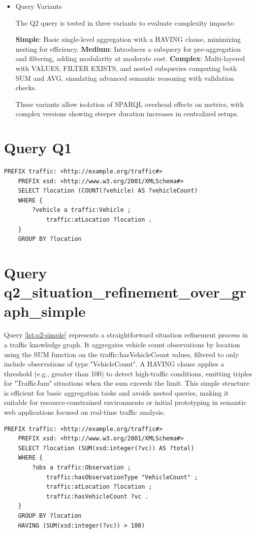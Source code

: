 \documentclass[5p,times]{elsarticle}
\begin{document}
\begin{itemize}
    \item Query Variants
    
    The Q2 query is tested in three variants to evaluate complexity impacts:

    \textbf{Simple}: Basic single-level aggregation with a HAVING clause, minimizing nesting for efficiency.
    \textbf{Medium}: Introduces a subquery for pre-aggregation and filtering, adding modularity at moderate cost.
    \textbf{Complex}: Multi-layered with VALUES, FILTER EXISTS, and nested subqueries computing both SUM and AVG, simulating advanced semantic reasoning with validation checks.
    

These variants allow isolation of SPARQL overhead effects on metrics, with complex versions showing steeper duration increases in centralized setups.


\end{itemize}

\section{Query Q1}

\begin{lstlisting}[caption={Query for q1\_vehicle\_count\_observations}, float=H, label={lst:q1}]
    PREFIX traffic: <http://example.org/traffic#>
    PREFIX xsd: <http://www.w3.org/2001/XMLSchema#>
    SELECT ?location (COUNT(?vehicle) AS ?vehicleCount)
    WHERE {
        ?vehicle a traffic:Vehicle ;
            traffic:atLocation ?location .
    }
    GROUP BY ?location
\end{lstlisting}


\section{Query q2_situation_refinement_over_graph_simple}

Query \ref{lst:q2-simple} represents a straightforward situation refinement process in a
 traffic knowledge graph. It aggregates vehicle count observations by location using the SUM function on the traffic:hasVehicleCount values, filtered to only include observations of type "VehicleCount". A HAVING clause applies a threshold (e.g., greater than 100) to detect high-traffic conditions, emitting triples for "TrafficJam" situations when the sum exceeds the limit. This simple structure is efficient for basic aggregation tasks and avoids nested queries, making it suitable for resource-constrained environments or initial prototyping in semantic web applications focused on real-time traffic analysis.
\begin{lstlisting}[caption={Query for q2\_situation\_refinement\_over\_graph\_simple}, float=H, label={lst:q2-simple}]
    PREFIX traffic: <http://example.org/traffic#>
    PREFIX xsd: <http://www.w3.org/2001/XMLSchema#>
    SELECT ?location (SUM(xsd:integer(?vc)) AS ?total)
    WHERE {
        ?obs a traffic:Observation ;
            traffic:hasObservationType "VehicleCount" ;
            traffic:atLocation ?location ;
            traffic:hasVehicleCount ?vc .
    }
    GROUP BY ?location
    HAVING (SUM(xsd:integer(?vc)) > 100)
    \end{lstlisting}
\end{document}
